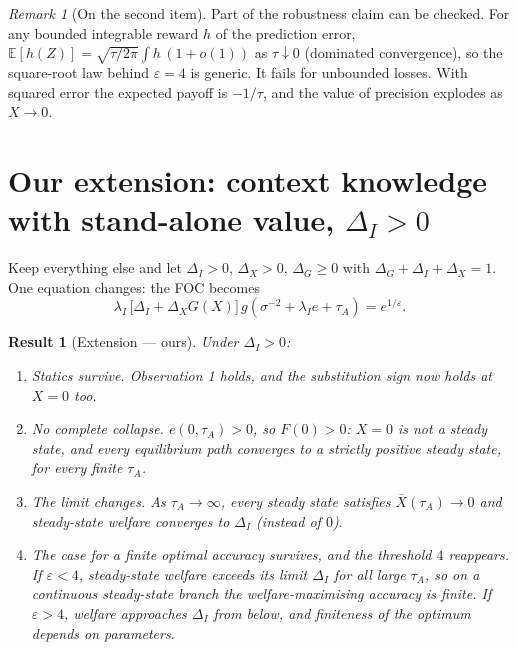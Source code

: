 \documentclass[11pt,a4paper]{article}
\newtheorem{result}{Result}
\theoremstyle{definition}
\theoremstyle{remark}
\newtheorem{remark}{Remark}
\newcommand{\E}{\mathbb{E}}
\newcommand{\tA}{\tau_A}
\newcommand{\lI}{\lambda_I}
\begin{document}
\begin{remark}[On the second item]
Part of the robustness claim can be checked. For any bounded integrable reward $h$ of the prediction error,
$\E[h(Z)]=\sqrt{\tau/2\pi}\int h\,(1+o(1))$ as $\tau\downarrow0$ (dominated convergence), so the square-root law
behind $\varepsilon=4$ is generic. It fails for unbounded losses. With squared error the expected payoff is
$-1/\tau$, and the value of precision explodes as $X\to0$.
\end{remark}

\section[Our extension: stand-alone context knowledge]{Our extension: context knowledge with stand-alone value, $\Delta_I>0$}

Keep everything else and let $\Delta_I>0$, $\Delta_X>0$, $\Delta_G\ge0$ with $\Delta_G+\Delta_I+\Delta_X=1$.
One equation changes: the FOC becomes
\begin{equation}\label{eq:focDI}
\lI\,\bigl[\Delta_I+\Delta_XG(X)\bigr]\,g(\sigma^{-2}+\lI e+\tA)=e^{1/\varepsilon}.
\end{equation}

\begin{result}[Extension --- ours]\label{res:ext}
Under $\Delta_I>0$:
\begin{enumerate}[label=(\roman*),nosep]
\item \emph{Statics survive.} Observation 1 holds, and the substitution sign now holds at $X=0$ too.
\item \emph{No complete collapse.} $e(0,\tA)>0$, so $F(0)>0$: $X=0$ is not a steady state, and every
equilibrium path converges to a strictly positive steady state, for every finite $\tA$.
\item \emph{The limit changes.} As $\tA\to\infty$, every steady state satisfies $\bar X(\tA)\to0$ and
steady-state welfare converges to $\Delta_I$ (instead of $0$).
\item \emph{The case for a finite optimal accuracy survives, and the threshold $4$ reappears.} If
$\varepsilon<4$, steady-state welfare exceeds its limit $\Delta_I$ for all large $\tA$, so on a continuous
steady-state branch the welfare-maximising accuracy is finite. If $\varepsilon>4$, welfare approaches $\Delta_I$
from below, and finiteness of the optimum depends on parameters.
\end{enumerate}
\end{result}
\end{document}
